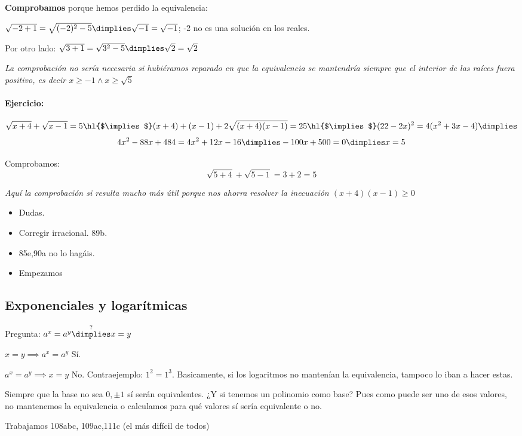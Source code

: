 \textbf{Comprobamos} porque hemos perdido la equivalencia: 

$\sqrt{-2+1} = \sqrt{(-2)^2-5} \dimplies \sqrt{-1} = \sqrt{-1}$; -2 no es una solución en los reales.

Por otro lado: $\sqrt{3+1} = \sqrt{3^2-5} \dimplies \sqrt{2}=\sqrt{2}$

\textit{La comprobación no sería necesaria si hubiéramos reparado en que la equivalencia se mantendría siempre que el interior de las raíces fuera positivo, es decir $x\geq -1 \wedge x\geq \sqrt{5}$}

\paragraph{Ejercicio:} 
\[
	\sqrt{x+4}+\sqrt{x-1} = 5 \text{\hl{$\implies$}} (x+4)+(x-1) + 2\sqrt{(x+4)(x-1)} = 25 \text{\hl{$\implies$}} (22-2x)^2 = 4(x^2+3x-4) \dimplies 
\]
\[
	4x^2-88x + 484 = 4x^2+12x-16 \dimplies -100x + 500 = 0 \dimplies x=5
\]

Comprobamos:
\[
	\sqrt{5+4}+\sqrt{5-1} = 3+2 = 5
\]

\textit{Aquí la comprobación si resulta mucho más útil porque nos ahorra resolver la inecuación $(x+4)(x-1) \geq 0$}

\begin{itemize}
	\item Dudas.
	\item Corregir irracional. 89b.
	\item 85e,90a no lo hagáis.
	\item Empezamos 
\end{itemize}



\subsection{Exponenciales y logarítmicas}

Pregunta: $a^x=a^y \overset{?}{\dimplies} x=y$

$x=y\implies a^x=a^y$ Sí.

$a^x=a^y\implies x=y$ No. Contraejemplo: $1^2=1^3$.  Basicamente, si los logaritmos no mantenían la equivalencia, tampoco lo iban a hacer estas.

Siempre que la base no sea $0,±1$ sí serán equivalentes. ¿Y si tenemos un polinomio como base? Pues como puede ser uno de esos valores, no mantenemos la equivalencia o calculamos para qué valores sí sería equivalente o no.

Trabajamos 108abc, 109ac,111c (el más difícil de todos)

